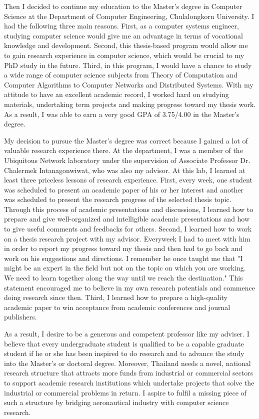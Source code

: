 \documentclass[a4paper,10pt]{report}
\begin{document}
\vspace{0.2cm}
Then I decided to continue my education to the Master's degree in Computer Science at the Department of Computer Engineering, Chulalongkorn University. I had the following three main reasons. First, as a computer systems engineer, studying computer science would give me an advantage in terms of vocational knowledge and development. Second, this thesis-based program would allow me to gain research experience in computer science, which would be crucial to my PhD study in the future. Third, in this program, I would have a chance to study a wide range of computer science subjects from Theory of Computation and Computer Algorithms to Computer Networks and Distributed Systems. With my attitude to have an excellent academic record, I worked hard on studying materials, undertaking term projects and making progress toward my thesis work. As a result, I was able to earn a very good GPA of 3.75/4.00 in the Master's degree.

\vspace{0.2cm}
My decision to pursue the Master's degree was correct because I gained a lot of valuable research experience there. At the department, I was a member of the Ubiquitous Network laboratory under the supervision of Associate Professor Dr. Chalermek Intanagonwiwat, who was also my advisor. At this lab, I learned at least three priceless lessons of research experience. First, every week, one student was scheduled to present an academic paper of his or her interest and another was scheduled to present the research progress of the selected thesis topic. Through this process of academic presentations and discussions, I learned how to prepare and give well-organized and intelligible academic presentations and how to give useful comments and feedbacks for others. Second, I learned how to work on a thesis research project with my advisor. Everyweek I had to meet with him in order to report my progress toward my thesis and then had to go back and work on his suggestions and directions. I remember he once taught me that "I might be an expert in the field but not on the topic on which you are working. We need to learn together along the way until we reach the destination." This statement encouraged me to believe in my own research potentials and commence doing research since then. Third, I learned how to prepare a high-quality academic paper to win acceptance from academic conferences and journal publishers.

\vspace{0.2cm}
As a result, I desire to be a generous and competent professor like my adviser. I believe that every undergraduate student is qualified to be a capable graduate student if he or she has been inspired to do research and to advance the study into the Master's or doctoral degree. Moreover, Thailand needs a novel, national research structure that attracts more funds from industrial or commercial sectors to support academic research institutions which undertake projects that solve the industrial or commercial problems in return. I aspire to fulfil a missing piece of such a structure by bridging aeronautical industry with computer science research.
\end{document}
